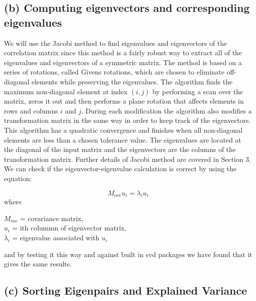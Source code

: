 \documentclass[12pt,twoside]{article}
\begin{document}
\subsection{(b) Computing eigenvectors and corresponding eigenvalues}
\bigbreak
We will use the Jacobi method to find eigenvalues and eigenvectors of the correlation matrix since this method is a fairly robust way to extract all of the eigenvalues and eigenvectors of a symmetric matrix. The method is based on a series of rotations, called Givens rotations, which are chosen to eliminate off-diagonal elements while preserving the eigenvalues. The algorithm finds the maximum non-diagonal element at index $(i,j)$ by performing a scan over the matrix, zeros it out and then performs a plane rotation that affects elements in rows and columns $i$ and $j$. During each modification the algorithm also modifies a transformation matrix in the same way in order to keep track of the eigenvectors. This algorithm has a quadratic convergence and finishes when all non-diagonal elements are less than a chosen tolerance value. The eigenvalues are located at the diagonal of the input matrix and the eigenvectors are the columns of the transformation matrix. Further details of Jacobi method are covered in Section 3.\\

We can check if the eigenvector-eigenvalue calculation is correct by using the equation:

$$M_{cov} u_i = \lambda_i u_i$$ 
where
\begin{center}
$M_{cov}$ = covariance matrix, \\
$u_i$ = ith colummn of eigenvector matrix, \\
$\lambda_i$ = eigenvalue associated with $u_i$\\
\end{center}
and by testing it this way and against built in svd packages we have found that it gives the same results.

\subsection{(c) Sorting Eigenpairs and Explained Variance}
\end{document}

